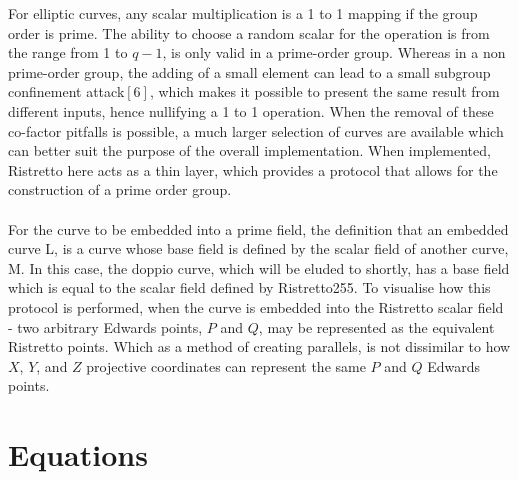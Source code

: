 \documentclass{article}
\begin{document}
For elliptic curves, any scalar multiplication is a 1 to 1 mapping if the group order is prime. The ability to choose a random scalar for the operation is from the range from 1 to $q-1$, is only valid in a prime-order group. Whereas in a non prime-order group, the adding of a small element can lead to a small subgroup confinement attack$[6]$, which makes it possible to present the same result from different inputs, hence nullifying a 1 to 1 operation. When the removal of these co-factor pitfalls is possible, a much larger selection of curves are available which can better suit the purpose of the overall implementation. When implemented, Ristretto here acts as a thin layer, which provides a protocol that allows for the construction of a prime order group.  \\\\
For the curve to be embedded into a prime field, the definition that an embedded curve L, is a curve whose base field is defined by the scalar field of another curve, M. In this case, the doppio curve, which will be eluded to shortly, has a base field which is equal to the scalar field defined by Ristretto255. To visualise how this protocol is performed, when the curve is embedded into the Ristretto scalar field - two arbitrary Edwards points, $P$ and $Q$, may be represented as the equivalent Ristretto points. Which as a method of creating parallels, is not dissimilar to how $X$, $Y$, and $Z$ projective coordinates can represent the same $P$ and $Q$ Edwards points.
\section{Equations}
\end{document}
